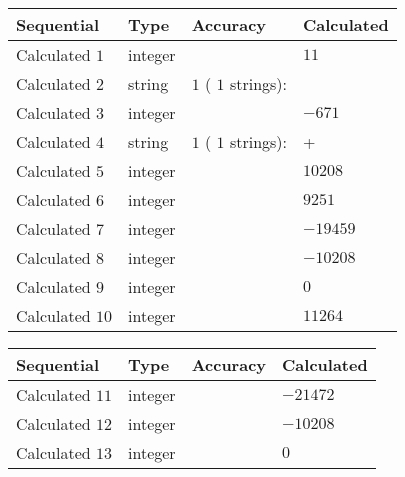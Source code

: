 \documentclass[12pt]{article}
\begin{document}
  
\noindent\begin{tabular}{|l|l|l|l|}
\hline
 Sequential & Type & Accuracy & Calculated \\ 
\hline
 
 
  Calculated $            1 $ & integer &  & 
  $ 11 $ 
 \\  \hline  
 
 
  Calculated $            2 $ & string & $            1  $ ( $           1  $ strings): 
 & 
 \\  \hline  
 
 
  Calculated $            3 $ & integer &  & 
  $ -671 $ 
 \\  \hline  
 
 
  Calculated $            4 $ & string & $            1  $ ( $           1  $ strings): 
 & +
 \\  \hline  
 
 
  Calculated $            5 $ & integer &  & 
  $ 10208 $ 
 \\  \hline  
 
 
  Calculated $            6 $ & integer &  & 
  $ 9251 $ 
 \\  \hline  
 
 
  Calculated $            7 $ & integer &  & 
  $ -19459 $ 
 \\  \hline  
 
 
  Calculated $            8 $ & integer &  & 
  $ -10208 $ 
 \\  \hline  
 
 
  Calculated $            9 $ & integer &  & 
  $ 0 $ 
 \\  \hline  
 
 
  Calculated $           10 $ & integer &  & 
  $ 11264 $ 
 \\  \hline  
 \end{tabular}
   
   
  
  
\noindent\begin{tabular}{|l|l|l|l|}
\hline
 Sequential & Type & Accuracy & Calculated \\ 
\hline
 
 
  Calculated $           11 $ & integer &  & 
  $ -21472 $ 
 \\  \hline  
 
 
  Calculated $           12 $ & integer &  & 
  $ -10208 $ 
 \\  \hline  
 
 
  Calculated $           13 $ & integer &  & 
  $ 0 $ 
 \\  \hline  
 \end{tabular}
   
\end{document}
